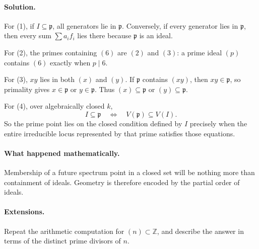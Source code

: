 \paragraph{Solution.}
For (1), if \(I\subseteq\mathfrak p\), all generators lie in \(\mathfrak p\).  Conversely,
if every generator lies in \(\mathfrak p\), then every sum \(\sum a_i f_i\) lies there
because \(\mathfrak p\) is an ideal.

For (2), the primes containing \((6)\) are \((2)\) and \((3)\): a prime ideal \((p)\)
contains \((6)\) exactly when \(p\mid6\).

For (3), \(xy\) lies in both \((x)\) and \((y)\).  If \(\mathfrak p\) contains \((xy)\),
then \(xy\in\mathfrak p\), so primality gives \(x\in\mathfrak p\) or
\(y\in\mathfrak p\).  Thus \((x)\subseteq\mathfrak p\) or \((y)\subseteq\mathfrak p\).

For (4), over algebraically closed \(k\),
\[
I\subseteq\mathfrak p
\quad\Longleftrightarrow\quad
V(\mathfrak p)\subseteq V(I).
\]
So the prime point lies on the closed condition defined by \(I\) precisely when the entire
irreducible locus represented by that prime satisfies those equations.

\paragraph{What happened mathematically.}
Membership of a future spectrum point in a closed set will be nothing more than containment
of ideals.  Geometry is therefore encoded by the partial order of ideals.

\paragraph{Extensions.}
Repeat the arithmetic computation for \((n)\subset\mathbb Z\), and describe the answer in
terms of the distinct prime divisors of \(n\).
\fi
